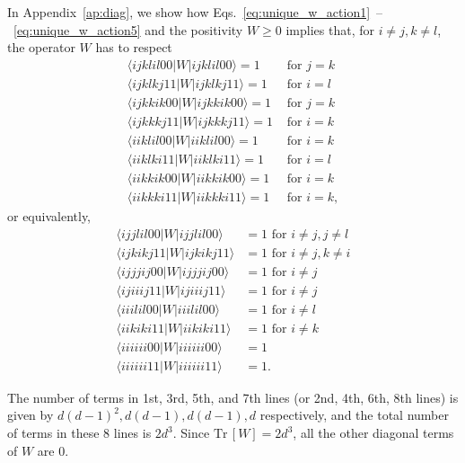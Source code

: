 \documentclass[a4paper,twocolumn,accepted=2022-10-23]{quantumarticle}
\newcommand{\bra}[1]{\langle {#1} \vert}
\newcommand{\ket}[1]{\vert {#1} \rangle}
\newcommand{\Tr}[0]{{\mathrm{Tr}}}
\theoremstyle{definition}
\begin{document}
In Appendix~\ref{ap:diag}, we show how Eqs.~\eqref{eq:unique_w_action1}~--~\eqref{eq:unique_w_action5} and the positivity $W \geq 0$ implies that, for  $ i \neq j, k \neq l$, the operator $W$ has to respect
\begin{align}
\bra{ijklil00} W \ket{ijklil00} = 1 &\text{ for } j = k \label{eq:unique_w_diag_result_1} \\
\bra{ijklkj11} W \ket{ijklkj11} = 1 &\text{ for } i = l \\
\bra{ijkkik00} W \ket{ijkkik00} = 1 &\text{ for } j = k \\
\bra{ijkkkj11} W \ket{ijkkkj11} = 1 &\text{ for } i = k \\
\bra{iiklil00} W \ket{iiklil00} = 1 &\text{ for } i = k \\
\bra{iiklki11} W \ket{iiklki11} = 1 &\text{ for } i = l \\
\bra{iikkik00} W \ket{iikkik00} = 1 &\text{ for } i = k \\
\bra{iikkki11} W \ket{iikkki11} = 1 &\text{ for } i = k, \label{eq:unique_w_diag_result_8}
\end{align}
or equivalently,
\begin{align}
\bra{ijjlil00} W \ket{ijjlil00} &= 1 \text{ for } i \neq j, j \neq l \\
\bra{ijkikj11} W \ket{ijkikj11} &= 1 \text{ for } i \neq j, k \neq i \\
\bra{ijjjij00} W \ket{ijjjij00} &= 1 \text{ for } i \neq j \\
\bra{ijiiij11} W \ket{ijiiij11} &= 1 \text{ for } i \neq j \\
\bra{iiilil00} W \ket{iiilil00} &= 1 \text{ for } i \neq l \\
\bra{iikiki11} W \ket{iikiki11} &= 1 \text{ for } i \neq k \\
\bra{iiiiii00} W \ket{iiiiii00} &= 1  \\
\bra{iiiiii11} W \ket{iiiiii11} &= 1 .
\end{align}

The number of terms in 1st, 3rd, 5th, and 7th lines (or 2nd, 4th, 6th, 8th lines) is given by
$d(d-1)^2, d(d-1), d(d-1), d $ respectively, and the total number of terms in these 8 lines is $2 d^3$.
Since $\Tr\, [W] = 2 d^3$, all the other diagonal terms of $W$ are 0.
\end{document}
